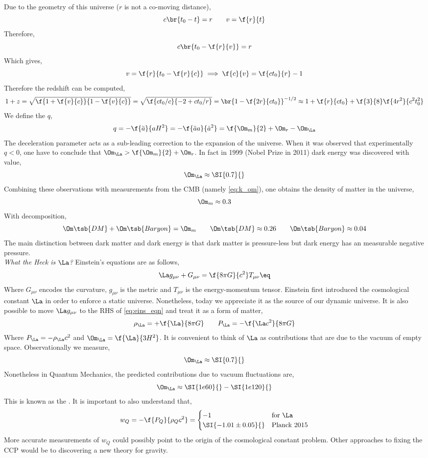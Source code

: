 \documentclass{article}
\begin{document}
Due to the geometry of this universe ($r$ is not a co-moving distance),
\[ c\br{t_0 - t} = r \qquad v = \f{r}{t} \]
Therefore,
\[ c\br{t_0 - \f{r}{v}} = r \]
Which gives,
\[ v = \f{r}{t_0 - \f{r}{c}} \implies \f{c}{v} = \f{ct_0}{r} - 1 \]
Therefore the redshift can be computed,
\[ 1 + z = \sqrt{\f{1 + \f{v}{c}}{1 - \f{v}{c}}} = \sqrt{\f{ct_0 / c}{-2+ct_0/r}} = \br{1 - \f{2r}{ct_0}}^{-1/2} \approx 1 + \f{r}{ct_0} + \f{3}{8}\f{4 r^2 }{c^2t_0^2} \]
We define the  $q$,
\[ q = -\f{\ddot a}{aH^2} = -\f{\ddot a a}{\dot a^2} = \f{\Om_m}{2} + \Om_r - \Om_{\La} \]
The deceleration parameter acts as a sub-leading correction to the expansion of the universe. When it was observed that experimentally $q < 0$, one have to conclude that $\Om_{\La} > \f{\Om_m}{2} + \Om_r$. In fact in 1999 (Nobel Prize in 2011) dark energy was discovered with value,
\[ \Om_{\La} \approx \SI{0.7}{} \]
Combining these observations with measurements from the CMB (namely \cref{eq:k_om}), one obtains the density of matter in the universe,
\[ \Om_{m} \approx 0.3  \]
With decomposition,
\[ \Om\tsb{DM} + \Om\tsb{Baryon} = \Om_{m} \qquad \Om\tsb{DM} \approx 0.26 \qquad \Om\tsb{Baryon} \approx 0.04 \]
The main distinction between dark matter and dark energy is that dark matter is pressure-less but dark energy has an measurable negative pressure. \\

\textit{What the Heck is $\La$?} Einstein's equations are as follows,
\[ \La g_{\mu \nu} + G_{\mu \nu} = \f{8 \pi G}{c^2} T_{\mu \nu } \eq \label{eq:eins_eqn}\]
Where $G_{\mu \nu}$ encodes the curvature, $g_{\mu \nu}$ is the metric and $T_{\mu\nu}$ is the energy-momentum tensor. Einstein first introduced the cosmological constant $\La$ in order to enforce a static universe. Nonetheless, today we appreciate it as the source of our dynamic universe. It is also possible to move $\La g_{\mu \nu}$ to the RHS of \cref{eq:eins_eqn} and treat it as a form of matter,
\[ \rho_{\La} = + \f{\La}{8 \pi G} \qquad P_{\La} = - \f{\La c^2}{8 \pi G} \]
Where $P_{\La} = - \rho_{\La} c^2$ and $\Om_{\La} = \f{\La}{3 H^2}$. It is convenient to think of $\La$ as contributions that are due to the vacuum of empty space. Observationally we measure,
\[ \Om_{\La} \approx \SI{0.7}{} \]
Nonetheless in Quantum Mechanics, the predicted contributions due to vacuum fluctuations are,
\[ \Om_{\La} \approx \SI{1e60}{} - \SI{1e120}{} \]
This is known as the . It is important to also understand that,
\[ w_{Q} = - \f{P_Q}{\rho_Q c^2} = \begin{cases}
    -1 & \text{for $\La$}\\
    \SI{-1.01 \pm 0.05}{} & \text{Planck 2015}\\
\end{cases} \]
More accurate measurements of $w_{Q}$ could possibly point to the origin of the cosmological constant problem. Other approaches to fixing the CCP would be to discovering a new theory for gravity.
\end{document}
